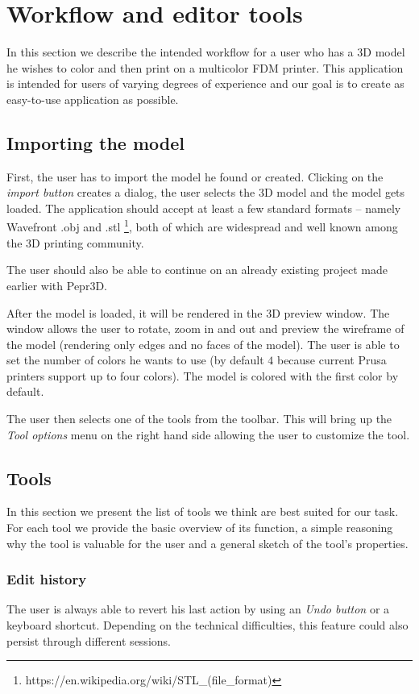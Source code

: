 \section{Workflow and editor tools}

In this section we describe the intended workflow for a user who has a 3D model he wishes to color and then print on a multicolor FDM printer. This application is intended for users of varying degrees of experience and our goal is to create as easy-to-use application as possible.

\subsection{Importing the model}

First, the user has to import the model he found or created. Clicking on the \textit{import button} creates a dialog, the user selects the 3D model and the model gets loaded. The application should accept at least a few standard formats -- namely Wavefront $.$obj and $.$stl \footnote{https://en.wikipedia.org/wiki/STL\_(file\_format)}, both of which are widespread and well known among the 3D printing community.

The user should also be able to continue on an already existing project made earlier with Pepr3D.

After the model is loaded, it will be rendered in the 3D preview window. The window allows the user to rotate, zoom in and out and preview the wireframe of the model (rendering only edges and no faces of the model). The user is able to set the number of colors he wants to use (by default $4$ because current Prusa printers support up to four colors). The model is colored with the first color by default.

The user then selects one of the tools from the toolbar. This will bring up the \textit{Tool options} menu on the right hand side allowing the user to customize the tool.

\subsection{Tools}

In this section we present the list of tools we think are best suited for our task. For each tool we provide the basic overview of its function, a simple reasoning why the tool is valuable for the user and a general sketch of the tool's properties.

\subsubsection{Edit history}
The user is always able to revert his last action by using an \textit{Undo button} or a keyboard shortcut. Depending on the technical difficulties, this feature could also persist through different sessions.

